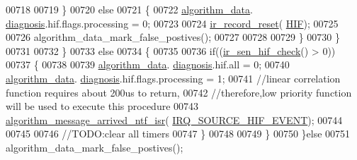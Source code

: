 \begin{DoxyCode}
00718 
00719                                                 \}
00720                                               \textcolor{keywordflow}{else}
00721                                                 \{
00722                                                     \hyperlink{a00038_a183caa40cd01e79ee309cc9c4a225197}{algorithm\_data}.
      \hyperlink{a00016_a16f85d57ec98b4ad05f5a2e10536b3c6}{diagnosis}.hif.flags.processing = 0;
00723 
00724                                                     \hyperlink{a00017_a1c9872e93491d95a24ab0bc723d39a74}{ir\_record\_reset}(
      \hyperlink{a00017_aaa1c1ffe30eff38b979b1af9d4e4ef19}{HIF});
00725 
00726                                                     algorithm\_data\_mark\_false\_postives();
00727 
00728 
00729                                                 \}
00730                                           \}
00731 
00732                                      \}
00733                                      \textcolor{keywordflow}{else}
00734                                      \{
00735 
00736                                                \textcolor{keywordflow}{if}((\hyperlink{a00017_a86870a0e00601a92277e689447739ce9}{ir\_sen\_hif\_check}() > 0))
00737                                                \{
00738 
00739                                                    \hyperlink{a00038_a183caa40cd01e79ee309cc9c4a225197}{algorithm\_data}.
      \hyperlink{a00016_a16f85d57ec98b4ad05f5a2e10536b3c6}{diagnosis}.hif.all = 0;
00740                                                    \hyperlink{a00038_a183caa40cd01e79ee309cc9c4a225197}{algorithm\_data}.
      \hyperlink{a00016_a16f85d57ec98b4ad05f5a2e10536b3c6}{diagnosis}.hif.flags.processing = 1;
00741                                                        \textcolor{comment}{//linear correlation function requires about 200us
       to return,}
00742                                                        \textcolor{comment}{//therefore,low priority function will be used to
       execute this procedure}
00743                                                         
      \hyperlink{a00038_a85471d58eae93d5d7e7e2b52e2b915d3}{algorithm\_message\_arrived\_ntf\_isr}(
      \hyperlink{a00021_a51725fc3a4c26625f15db1274791d961}{IRQ\_SOURCE\_HIF\_EVENT});
00744 
00745 
00746                                                         \textcolor{comment}{//TODO:clear all timers}
00747                                                \}
00748 
00749                                     \}
00750                       \}\textcolor{keywordflow}{else}
00751                           algorithm\_data\_mark\_false\_postives();

\end{DoxyCode}
